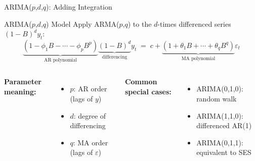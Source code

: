 \documentclass[aspectratio=169, 11pt]{beamer}
\begin{document}
\begin{frame}{ARIMA($p$,$d$,$q$): Adding Integration}
  \begin{definitionbox}{ARIMA($p$,$d$,$q$) Model}
    Apply ARMA($p$,$q$) to the $d$-times differenced series $(1-B)^d y_t$:
    \[
      \underbrace{(1-\phi_1 B - \cdots - \phi_p B^p)}_{\text{AR polynomial}}
      \underbrace{(1-B)^d}_{\text{differencing}}
      y_t
      \;=\;
      c + \underbrace{(1+\theta_1 B + \cdots + \theta_q B^q)}_{\text{MA polynomial}}
      \varepsilon_t
    \]
  \end{definitionbox}
  \vspace{0.1cm}
  \begin{columns}[T]
      \textbf{Parameter meaning:}
      \begin{itemize}\small
        \item $p$: AR order (lags of $y$)
        \item $d$: degree of differencing
        \item $q$: MA order (lags of $\varepsilon$)
      \end{itemize}
      \textbf{Common special cases:}
      \begin{itemize}\small
        \item ARIMA(0,1,0): random walk
        \item ARIMA(1,1,0): differenced AR(1)
        \item ARIMA(0,1,1): equivalent to SES \parencite[][Ch.~9]{Hyndman2021}
      \end{itemize}
  \end{columns}
\end{frame}
\end{document}
